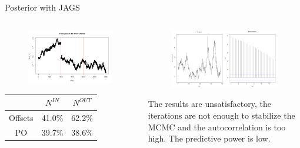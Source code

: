 \documentclass{beamer}
\begin{document}
\begin{frame}{Posterior with JAGS}
\begin{columns}
	\begin{column}{.5\linewidth}
		\begin{figure}[H]
			\centering
			\includegraphics[width=1\linewidth]{pictures/three_chains.png} 
		\end{figure}
		\begin{tabular}{ |c|c|c| } 
			\hline
			& $N^{IN}$ & $N^{OUT}$ \\ 
			\hline
			Offsets & 41.0\% & 62.2\% \\ 
			PO & 39.7\% & 38.6\% \\ 
			\hline
		\end{tabular}
	\end{column}
	\begin{column}{0.5\linewidth}
		\begin{figure}[H]
			\centering
			\includegraphics[width=1\linewidth]{pictures/posterior_off.png} 
		\end{figure}
		The results are unsatisfactory, the iterations are not enough to stabilize the MCMC and the autocorrelation is too high. The \alert{predictive power} is low.
	\end{column}
\end{columns}
\end{frame}
\end{document}
